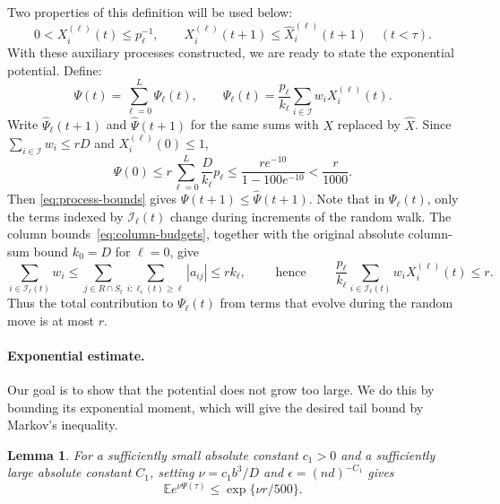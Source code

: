 \documentclass[reqno]{amsart}
\newtheorem{lemma}[theorem]{Lemma}
\theoremstyle{definition}
\newcommand{\E}{\mathbb E}
\begin{document}
Two properties of this definition will be used below:
\begin{equation}\label{eq:process-bounds} 0<X_i^{(\ell)}(t)\le p_\ell^{-1},\qquad X_i^{(\ell)}(t+1)\le\widehat X_i^{(\ell)}(t+1) \quad(t<\tau). \end{equation}
With these auxiliary processes constructed, we are ready to state the exponential potential. Define:
\begin{equation}\label{eq:potential} \Psi(t)=\sum_{\ell=0}^L\Psi_\ell(t),\qquad \Psi_\ell(t)=\frac{p_\ell}{k_\ell} \sum_{i\in\mathcal I}w_iX_i^{(\ell)}(t). \end{equation}
Write $\widehat\Psi_\ell(t+1)$ and $\widehat\Psi(t+1)$ for the same sums with $X$ replaced by $\widehat X$. Since $\sum_{i\in\mathcal I}w_i\le rD$ and $X_i^{(\ell)}(0)\le1$,
\begin{equation}\label{eq:potential-initial} \Psi(0)\le r\sum_{\ell=0}^L\frac{D}{k_\ell}p_\ell \le\frac{re^{-10}}{1-100e^{-10}}<\frac r{1000}. \end{equation}
Then \eqref{eq:process-bounds} gives $\Psi(t+1)\le\widehat\Psi(t+1)$. Note that in $\Psi_{\ell}(t)$, only the terms indexed by $\mathcal I_\ell(t)$ change during increments of the random walk. The column bounds~\eqref{eq:column-budgets}, together with the original absolute column-sum bound $k_0=D$ for $\ell=0$, give
\begin{equation}\label{eq:tracked-row-sum} \sum_{i\in\mathcal I_\ell(t)}w_i \le\sum_{j\in R\cap S_t}\sum_{i:\ell_i(t)\ge\ell}|a_{ij}| \le rk_\ell, \qquad \text{ hence } \qquad \frac{p_\ell}{k_\ell} \sum_{i\in\mathcal I_\ell(t)}w_iX_i^{(\ell)}(t)\le r. \end{equation}
Thus the total contribution to $\Psi_\ell(t)$ from terms that evolve during the random move is at most $r$.

\paragraph{Exponential estimate.}
Our goal is to show that the potential does not grow too large. We do this by bounding its exponential moment, which will give the desired tail bound by Markov's inequality.

\begin{lemma}
For a sufficiently small absolute constant $c_1>0$ and a sufficiently large absolute constant $C_1$, setting $\nu=c_1b^3/D$ and $\epsilon=(nd)^{-C_1}$ gives
\begin{equation}\label{eq:potential-final} \E e^{\nu\Psi(\tau)}\le\exp\{\nu r/500\}. \end{equation}
\end{lemma}
\end{document}
